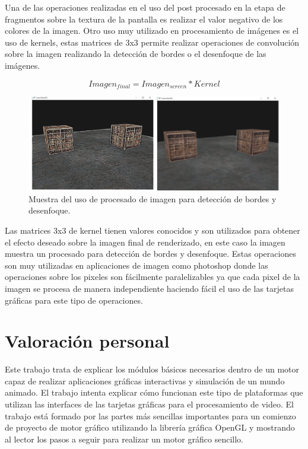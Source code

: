 \documentclass[a4paper, 17pt]{book}
\begin{document}
Una de las operaciones realizadas en el uso del post procesado en la etapa de fragmentos sobre la textura de la pantalla
es realizar el valor negativo de los colores de la imagen. Otro uso muy utilizado en procesamiento de imágenes es el uso
de kernels, estas matrices de 3x3 permite realizar operaciones de convolución sobre la imagen realizando la detección de
bordes o el desenfoque de las imágenes.

\begin{equation} \label{distance}
    Imagen_{final} = Imagen_{screen} * Kernel
\end{equation}

\begin{figure}[H]
    \centering
    \includegraphics[scale=0.35, keepaspectratio]{img/PostProcessing.png}
    \caption{Muestra del uso de procesado de imagen para detección de bordes y desenfoque.}
    \label{figura:materialesBlender}
\end{figure}

Las matrices 3x3 de kernel tienen valores conocidos y son utilizados para obtener el efecto deseado sobre la imagen final 
de renderizado, en este caso la imagen muestra un procesado para detección de bordes y desenfoque. Estas operaciones son
muy utilizadas en aplicaciones de imagen como photoshop donde las operaciones sobre los pixeles son fácilmente paralelizables
ya que cada pixel de la imagen se procesa de manera independiente haciendo fácil el uso de las tarjetas gráficas para este
tipo de operaciones.


\section{Valoración personal}
\label{sec:valoracion}

Este trabajo trata de explicar los módulos básicos necesarios dentro de un motor capaz de realizar aplicaciones gráficas
interactivas y simulación de un mundo animado. El trabajo intenta explicar cómo funcionan este tipo de plataformas que utilizan
las interfaces de las tarjetas gráficas para el procesamiento de video. El trabajo está formado por las partes más sencillas
importantes para un comienzo de proyecto de motor gráfico utilizando la librería gráfica OpenGL y mostrando al lector los
pasos a seguir para realizar un motor gráfico sencillo.
\end{document}
